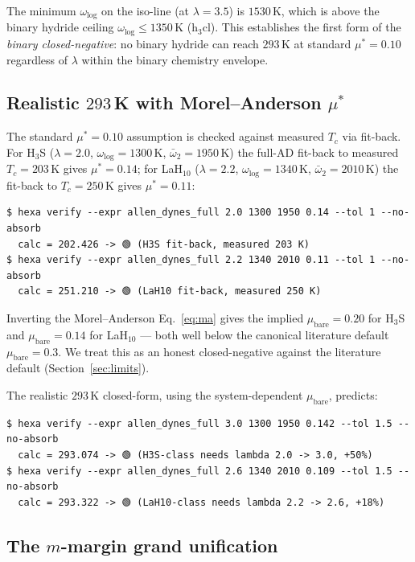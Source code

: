 \documentclass[11pt,a4paper]{article}
\begin{document}
\noindent The minimum $\omega_{\log}$ on the iso-line (at $\lambda=3.5$)
is $1530$\,K, which is above the binary hydride ceiling
$\omega_{\log}\leq 1350$\,K (h$_3$cl). This establishes the first form
of the \emph{binary closed-negative}: no binary hydride can reach
$293$\,K at standard $\mu^*=0.10$ regardless of $\lambda$ within the
binary chemistry envelope.

\subsection{Realistic $293$\,K with Morel--Anderson $\mu^*$}
\label{sec:results-realistic}

The standard $\mu^*=0.10$ assumption is checked against measured
$T_c$ via fit-back. For H$_3$S ($\lambda=2.0$, $\omega_{\log}=1300$\,K,
$\bar\omega_2=1950$\,K) the full-AD fit-back to measured $T_c=203$\,K
gives $\mu^*=0.14$; for LaH$_{10}$ ($\lambda=2.2$, $\omega_{\log}=1340$\,K,
$\bar\omega_2=2010$\,K) the fit-back to $T_c=250$\,K gives $\mu^*=0.11$:

\begin{lstlisting}[basicstyle=\ttfamily\small,frame=single,xleftmargin=0pt]
$ hexa verify --expr allen_dynes_full 2.0 1300 1950 0.14 --tol 1 --no-absorb
  calc = 202.426 -> 🟢 (H3S fit-back, measured 203 K)
$ hexa verify --expr allen_dynes_full 2.2 1340 2010 0.11 --tol 1 --no-absorb
  calc = 251.210 -> 🟢 (LaH10 fit-back, measured 250 K)
\end{lstlisting}

Inverting the Morel--Anderson Eq.~\ref{eq:ma} gives the implied
$\mu_{\text{bare}}=0.20$ for H$_3$S and $\mu_{\text{bare}}=0.14$ for
LaH$_{10}$ --- both well below the canonical literature default
$\mu_{\text{bare}}=0.3$. We treat this as an honest closed-negative
against the literature default (Section~\ref{sec:limits}).

The realistic $293$\,K closed-form, using the system-dependent
$\mu_{\text{bare}}$, predicts:

\begin{lstlisting}[basicstyle=\ttfamily\small,frame=single,xleftmargin=0pt]
$ hexa verify --expr allen_dynes_full 3.0 1300 1950 0.142 --tol 1.5 --no-absorb
  calc = 293.074 -> 🟢 (H3S-class needs lambda 2.0 -> 3.0, +50%)
$ hexa verify --expr allen_dynes_full 2.6 1340 2010 0.109 --tol 1.5 --no-absorb
  calc = 293.322 -> 🟢 (LaH10-class needs lambda 2.2 -> 2.6, +18%)
\end{lstlisting}

\subsection{The $m$-margin grand unification}
\label{sec:results-margin}
\end{document}
